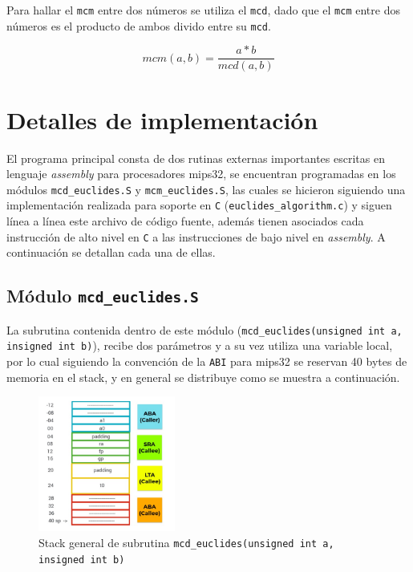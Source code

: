\documentclass[titlepage,a4paper]{article}
\begin{document}
Para hallar el \verb|mcm| entre dos números se utiliza el \verb|mcd|, dado que el \verb|mcm| entre dos números es el producto de ambos divido entre su \verb|mcd|.

$$mcm(a,b) = \frac{a * b}{mcd(a,b)}$$



\section{Detalles de implementación}\label{sec:detalles_implementacion}
El programa principal consta de dos rutinas externas importantes escritas en lenguaje \textit{assembly} para procesadores mips32, se encuentran programadas en los módulos \verb|mcd_euclides.S| y \verb|mcm_euclides.S|, las cuales se hicieron siguiendo una implementación realizada para soporte en \verb|C| (\verb|euclides_algorithm.c|) y siguen línea a línea este archivo de código fuente, además tienen asociados cada instrucción de alto nivel en \verb|C| a las instrucciones de bajo nivel en \textit{assembly}. A continuación se detallan cada una de ellas.


\cprotect\subsection{Módulo \verb|mcd_euclides.S|}
La subrutina contenida dentro de este módulo (\verb|mcd_euclides(unsigned int a, insigned int b)|), recibe dos parámetros y a su vez utiliza una variable local, por lo cual siguiendo la convención de la \verb|ABI| para mips32 se reservan 40 bytes de memoria en el stack, y en general se distribuye como se muestra a continuación.

\begin{figure}[H]
\centering
\includegraphics[width=0.4\textwidth]{images/stackMcdCall.jpeg}
\cprotect\caption{\label{fig:seq01}Stack general de subrutina \verb|mcd_euclides(unsigned int a, insigned int b)|}
\end{figure}
\end{document}
